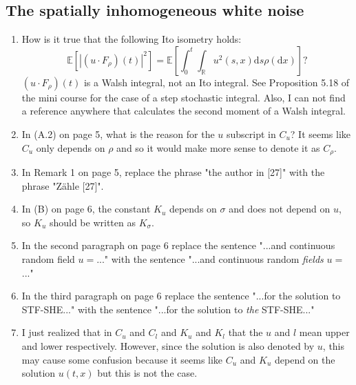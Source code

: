\documentclass[a4paper,11pt]{article}
\numberwithin{equation}{section}
\numberwithin{equation}{section}
\theoremstyle{plain}
\theoremstyle{definition}
\newcommand{\ud}{\ensuremath{\mathrm{d} }}
\newcommand{\R}{\mathbb{R}}
\begin{document}
\subsection{The spatially inhomogeneous white noise}
\begin{enumerate}
	\item 
How is it true that the following Ito isometry holds:
	\[
		\mathbb{E}\left[ |(u\cdot F_\rho)(t)|^2 \right] = \mathbb{E}\left[ \int_0^t \int_{\R} u^2(s,x) \ud s \rho(\ud x) \right]?
	\]
$(u\cdot F_\rho)(t)$ is a Walsh integral, not an Ito integral. See Proposition 5.18 of the mini course for the case of a step stochastic integral. Also, I can not find a reference anywhere that calculates the second moment of a Walsh integral.
	
	\item 
In (A.2) on page 5, what is the reason for the $u$ subscript in $C_u$? It seems like $C_u$ only depends on $\rho$ and so it would make more sense to denote it as $C_\rho$.

	\item
In Remark 1 on page 5, replace the phrase "the author in [27]" with the phrase "Z\"{a}hle [27]".

	\item 
In (B) on page 6, the constant $K_u$ depends on $\sigma$ and does not depend on $u$, so $K_u$ should be written as $K_\sigma$. 

	\item 
In the second paragraph on page 6 replace the sentence "...and continuous random field $u=$..." with the sentence "...and continuous random \textit{fields} $u=$..."

	\item 
In the third paragraph on page 6 replace the sentence "...for the solution to STF-SHE..." with the sentence "...for the solution to \textit{the} STF-SHE..."

	\item
I just realized that in $C_u$ and $C_l$ and $K_u$ and $K_l$ that the $u$ and $l$ mean upper and lower respectively. However, since the solution is also denoted by $u$, this may cause some confusion because it seems like $C_u$ and $K_u$ depend on the solution $u(t,x)$ but this is not the case. 

\end{enumerate}
\end{document}
